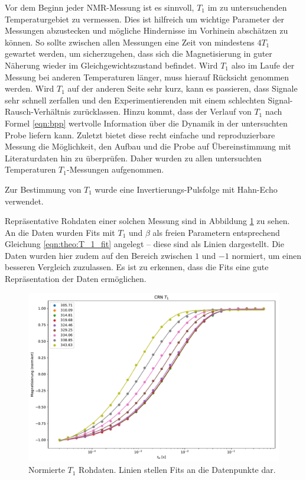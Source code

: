 Vor dem Beginn jeder NMR-Messung ist es sinnvoll, $T_1$ im zu untersuchenden Temperaturgebiet zu vermessen. Dies ist hilfreich um wichtige Parameter der Messungen abzustecken und mögliche Hindernisse im Vorhinein abschätzen zu können. So sollte zwischen allen Messungen eine Zeit von mindestens $4 T_1$ gewartet werden, um sicherzugehen, dass sich die Magnetisierung in guter Näherung wieder im Gleichgewichtszustand befindet. Wird $T_1$ also im Laufe der Messung bei anderen Temperaturen länger, muss hierauf Rücksicht genommen werden. Wird $T_1$ auf der anderen Seite sehr kurz, kann es passieren, dass Signale sehr schnell zerfallen und den Experimentierenden mit einem schlechten Signal-Rausch-Verhältnis zurücklassen. Hinzu kommt, dass der Verlauf von $T_1$ nach Formel \eqref{eqn:bpp} wertvolle Information über die Dynamik in der untersuchten Probe liefern kann. Zuletzt bietet diese recht einfache und reproduzierbare Messung die Möglichkeit, den Aufbau und die Probe auf Übereinstimmung mit Literaturdaten hin zu überprüfen. Daher wurden zu allen untersuchten Temperaturen $T_1$-Messungen aufgenommen.

Zur Bestimmung von $T_1$ wurde eine Invertierungs-Pulsfolge mit Hahn-Echo verwendet.

Repräsentative Rohdaten einer solchen Messung sind in Abbildung \ref{fig:res:T_1_roh} zu sehen. An die Daten wurden Fits mit $T_1$ und $\beta$ als freien Parametern entsprechend Gleichung \eqref{eqn:theo:T_1_fit} angelegt -- diese sind als Linien dargestellt. Die Daten wurden hier zudem auf den Bereich zwischen $1$ und $-1$ normiert, um einen besseren Vergleich zuzulassen. Es ist zu erkennen, dass die Fits eine gute Repräsentation der Daten ermöglichen.
\begin{figure}
	\begin{center}
		\includegraphics[width=.9\textwidth]{graphics/plots/T1/t1_roh.pdf}
	\end{center}
	\caption{Normierte $T_1$ Rohdaten. Linien stellen Fits an die Datenpunkte dar.} \label{fig:res:T_1_roh}
\end{figure}

